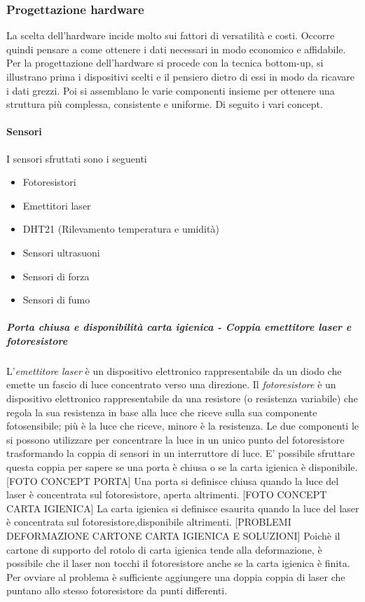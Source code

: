 \documentclass[12pt]{article}
\begin{document}
\subsubsection{Progettazione hardware}
La scelta dell'hardware incide molto sui fattori di versatilità e costi. Occorre quindi pensare a come ottenere i dati necessari in modo economico e affidabile. Per la progettazione dell'hardware si procede con la tecnica bottom-up, si illustrano prima i dispositivi scelti e il pensiero dietro di essi in modo da ricavare i dati grezzi. Poi si assemblano le varie componenti insieme per ottenere una struttura più complessa, consistente e uniforme. Di seguito i vari concept.
\paragraph{Sensori}
I sensori sfruttati sono i seguenti
\begin{itemize}
\item Fotoresistori
\item Emettitori laser
\item DHT21 (Rilevamento temperatura e umidità)
\item Sensori ultrasuoni
\item Sensori di forza
\item Sensori di fumo
\end{itemize}
\subparagraph*{Porta chiusa e disponibilità carta igienica - Coppia emettitore laser e fotoresistore}
L'\textit{emettitore laser} è un dispositivo elettronico rappresentabile da un diodo che emette un fascio di luce concentrato verso una direzione.
Il \textit{fotoresistore} è un dispositivo elettronico rappresentabile da una resistore (o resistenza variabile) che regola la sua resistenza in base alla luce che riceve sulla sua componente fotosensibile; più è la luce che riceve, minore è la resistenza.
Le due componenti le si possono utilizzare per concentrare la luce in un unico punto del fotoresistore trasformando la coppia di sensori in un interruttore di luce.
E' possibile sfruttare questa coppia per sapere se una porta è chiusa o se la carta igienica è disponibile.
[FOTO CONCEPT PORTA] Una porta si definisce chiusa quando la luce del laser è concentrata sul fotoresistore, aperta altrimenti.
[FOTO CONCEPT CARTA IGIENICA] La carta igienica si definisce esaurita quando la luce del laser è concentrata sul fotoresistore,disponibile altrimenti.
[PROBLEMI DEFORMAZIONE CARTONE CARTA IGIENICA E SOLUZIONI] Poichè il cartone di supporto del rotolo di carta igienica tende alla deformazione, è possibile che il laser non tocchi il fotoresistore anche se la carta igienica è finita. Per ovviare al problema è sufficiente aggiungere una doppia coppia di laser che puntano allo stesso fotoresistore da punti differenti.
\end{document}
